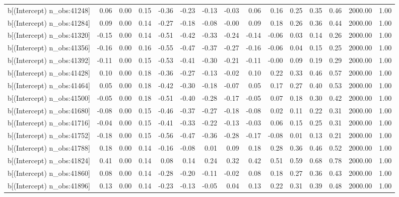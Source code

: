 \begin{table}[ht]
\begin{tabular}{rrrrrrrrrrrrrrr}
  b[(Intercept) n\_obs:41248] & 0.06 & 0.00 & 0.15 & -0.36 & -0.23 & -0.13 & -0.03 & 0.06 & 0.16 & 0.25 & 0.35 & 0.46 & 2000.00 & 1.00 \\ 
  b[(Intercept) n\_obs:41284] & 0.09 & 0.00 & 0.14 & -0.27 & -0.18 & -0.08 & -0.00 & 0.09 & 0.18 & 0.26 & 0.36 & 0.44 & 2000.00 & 1.00 \\ 
  b[(Intercept) n\_obs:41320] & -0.15 & 0.00 & 0.14 & -0.51 & -0.42 & -0.33 & -0.24 & -0.14 & -0.06 & 0.03 & 0.14 & 0.26 & 2000.00 & 1.00 \\ 
  b[(Intercept) n\_obs:41356] & -0.16 & 0.00 & 0.16 & -0.55 & -0.47 & -0.37 & -0.27 & -0.16 & -0.06 & 0.04 & 0.15 & 0.25 & 2000.00 & 1.00 \\ 
  b[(Intercept) n\_obs:41392] & -0.11 & 0.00 & 0.15 & -0.53 & -0.41 & -0.30 & -0.21 & -0.11 & -0.00 & 0.09 & 0.19 & 0.29 & 2000.00 & 1.00 \\ 
  b[(Intercept) n\_obs:41428] & 0.10 & 0.00 & 0.18 & -0.36 & -0.27 & -0.13 & -0.02 & 0.10 & 0.22 & 0.33 & 0.46 & 0.57 & 2000.00 & 1.00 \\ 
  b[(Intercept) n\_obs:41464] & 0.05 & 0.00 & 0.18 & -0.42 & -0.30 & -0.18 & -0.07 & 0.05 & 0.17 & 0.27 & 0.40 & 0.53 & 2000.00 & 1.00 \\ 
  b[(Intercept) n\_obs:41500] & -0.05 & 0.00 & 0.18 & -0.51 & -0.40 & -0.28 & -0.17 & -0.05 & 0.07 & 0.18 & 0.30 & 0.42 & 2000.00 & 1.00 \\ 
  b[(Intercept) n\_obs:41680] & -0.08 & 0.00 & 0.15 & -0.46 & -0.37 & -0.27 & -0.18 & -0.08 & 0.02 & 0.11 & 0.22 & 0.31 & 2000.00 & 1.00 \\ 
  b[(Intercept) n\_obs:41716] & -0.04 & 0.00 & 0.15 & -0.41 & -0.33 & -0.22 & -0.13 & -0.03 & 0.06 & 0.15 & 0.25 & 0.31 & 2000.00 & 1.00 \\ 
  b[(Intercept) n\_obs:41752] & -0.18 & 0.00 & 0.15 & -0.56 & -0.47 & -0.36 & -0.28 & -0.17 & -0.08 & 0.01 & 0.13 & 0.21 & 2000.00 & 1.00 \\ 
  b[(Intercept) n\_obs:41788] & 0.18 & 0.00 & 0.14 & -0.16 & -0.08 & 0.01 & 0.09 & 0.18 & 0.28 & 0.36 & 0.46 & 0.52 & 2000.00 & 1.00 \\ 
  b[(Intercept) n\_obs:41824] & 0.41 & 0.00 & 0.14 & 0.08 & 0.14 & 0.24 & 0.32 & 0.42 & 0.51 & 0.59 & 0.68 & 0.78 & 2000.00 & 1.00 \\ 
  b[(Intercept) n\_obs:41860] & 0.08 & 0.00 & 0.14 & -0.28 & -0.20 & -0.11 & -0.02 & 0.08 & 0.18 & 0.27 & 0.36 & 0.43 & 2000.00 & 1.00 \\ 
  b[(Intercept) n\_obs:41896] & 0.13 & 0.00 & 0.14 & -0.23 & -0.13 & -0.05 & 0.04 & 0.13 & 0.22 & 0.31 & 0.39 & 0.48 & 2000.00 & 1.00 \\ 

\end{tabular}
\end{table}
